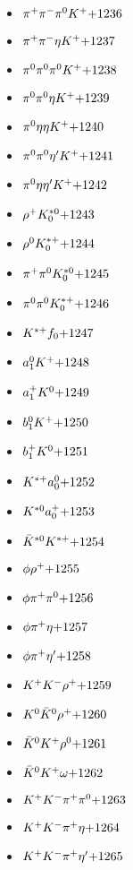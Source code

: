 \begin{multicols}{3}
\begin{itemize}
 \item $ \pi^{+} \pi^{-} \pi^{0} K^{+} \hfill{+1236}$
 \item $ \pi^{+} \pi^{-} \eta K^{+} \hfill{+1237}$
 \item $ \pi^{0} \pi^{0} \pi^{0} K^{+} \hfill{+1238}$
 \item $ \pi^{0} \pi^{0} \eta K^{+} \hfill{+1239}$
 \item $ \pi^{0} \eta \eta K^{+} \hfill{+1240}$
 \item $ \pi^{0} \pi^{0} {\eta^{\prime}} K^{+} \hfill{+1241}$
 \item $ \pi^{0} \eta {\eta^{\prime}} K^{+} \hfill{+1242}$
 \item $ \rho^{+} K_{0}^{*0} \hfill{+1243}$
 \item $ \rho^{0} K_{0}^{*+} \hfill{+1244}$
 \item $ \pi^{+} \pi^{0} K_{0}^{*0} \hfill{+1245}$
 \item $ \pi^{0} \pi^{0} K_{0}^{*+} \hfill{+1246}$
 \item $ K^{*+} f_{0} \hfill{+1247}$
 \item $ a_{1}^{0} K^{+} \hfill{+1248}$
 \item $ a_{1}^{+} K^{0} \hfill{+1249}$
 \item $ b_{1}^{0} K^{+} \hfill{+1250}$
 \item $ b_{1}^{+} K^{0} \hfill{+1251}$
 \item $ K^{*+} a_{0}^{0} \hfill{+1252}$
 \item $ K^{*0} a_{0}^{+} \hfill{+1253}$
 \item $ \bar{K}^{*0} K^{*+} \hfill{+1254}$
 \item $ \phi \rho^{+} \hfill{+1255}$
 \item $ \phi \pi^{+} \pi^{0} \hfill{+1256}$
 \item $ \phi \pi^{+} \eta \hfill{+1257}$
 \item $ \phi \pi^{+} {\eta^{\prime}} \hfill{+1258}$
 \item $ K^{+} K^{-} \rho^{+} \hfill{+1259}$
 \item $ K^{0} \bar{K}^{0} \rho^{+} \hfill{+1260}$
 \item $ \bar{K}^{0} K^{+} \rho^{0} \hfill{+1261}$
 \item $ \bar{K}^{0} K^{+} \omega \hfill{+1262}$
 \item $ K^{+} K^{-} \pi^{+} \pi^{0} \hfill{+1263}$
 \item $ K^{+} K^{-} \pi^{+} \eta \hfill{+1264}$
 \item $ K^{+} K^{-} \pi^{+} {\eta^{\prime}} \hfill{+1265}$

\end{itemize}
\end{multicols}
